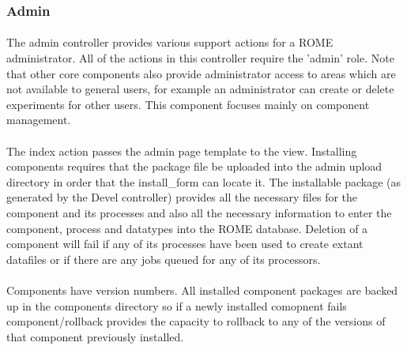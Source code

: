 \subsubsection{Admin}
\label{sec:controller_admin}

\paragraph{}
The admin controller provides various support actions for a ROME administrator. All of the actions in this controller require the 'admin' role. Note that other core components also provide administrator access to areas which are not available to general users, for example an administrator can create or delete experiments for other users. This component focuses mainly on component management.

\paragraph{}
The index action passes the admin page template to the view. Installing components requires that the package file be uploaded into the admin upload directory in order that the install\_form can locate it. The installable package (as generated by the Devel controller) provides all the necessary files for the component and its processes and also all the necessary information to enter the component, process and datatypes into the ROME database. Deletion of a component will fail if any of its processes have been used to create extant datafiles or if there are any jobs queued for any of its processors. 

\paragraph{}
Components have version numbers. All installed component packages are backed up in the components directory so if a newly installed comopnent fails component/rollback provides the capacity to rollback to any of the versions of that component previously installed.